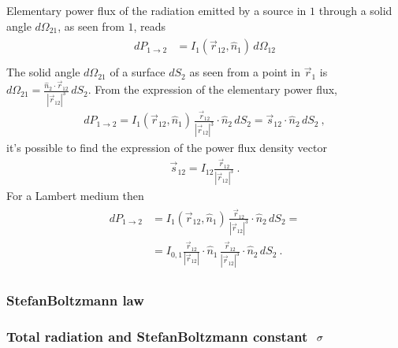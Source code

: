 \documentclass[letterpaper,10pt,english]{jupyterBook}
\begin{document}
\sphinxAtStartPar
Elementary power flux of the radiation emitted by a source in \(1\) through a solid angle \(d \Omega_{21}\), as seen from \(1\), reads
\begin{equation*}
\begin{split}\begin{aligned}
  d P_{1 \rightarrow 2}
  & = I_{1}(\vec{r}_{12}, \hat{n}_1) \, d \Omega_{12} \\
\end{aligned}\end{split}
\end{equation*}
\sphinxAtStartPar
The solid angle \(d \Omega_{21}\) of a surface \(d S_2\) as seen from a point in \(\vec{r}_1\) is \(d \Omega_{21} = \frac{\hat{n}_2 \cdot \vec{r}_{12}}{|\vec{r}_{12}|^3} \, dS_2\). From the expression of the elementary power flux,
\begin{equation*}
\begin{split}
 d P_{1 \rightarrow 2} = I_{1}(\vec{r}_{12}, \hat{n}_1) \, \frac{\vec{r}_{12} }{|\vec{r}_{12}|^3} \cdot \hat{n}_2 \, dS_2 = \vec{s}_{12} \cdot \hat{n}_2 \, dS_2 \ ,
\end{split}
\end{equation*}
\sphinxAtStartPar
it’s possible to find the expression of the power flux density vector
\begin{equation*}
\begin{split}\vec{s}_{12} = I_{12} \frac{\vec{r}_{12}}{|\vec{r}_{12}|^3} \ .\end{split}
\end{equation*}
\sphinxAtStartPar
For a Lambert medium then
\begin{equation}\label{equation:ch/heat-transfer-radiation:power-flux:radiant-intensity}
\begin{split}\begin{aligned}
 d P_{1 \rightarrow 2}
 & = I_{1}(\vec{r}_{12}, \hat{n}_1) \, \frac{\vec{r}_{12} }{|\vec{r}_{12}|^3} \cdot \hat{n}_2 \, dS_2 = \\
 & = I_{0,1} \frac{\vec{r}_{12}}{|\vec{r}_{12}|} \cdot \hat{n}_1 \, \frac{\vec{r}_{12} }{|\vec{r}_{12}|^3} \cdot \hat{n}_2 \, dS_2 \ .
\end{aligned}\end{split}
\end{equation}

\subsubsection{Stefan\sphinxhyphen{}Boltzmann law}
\label{\detokenize{ch/heat-transfer-radiation:stefan-boltzmann-law}}\subsubsection*{Total radiation and Stefan\sphinxhyphen{}Boltzmann constant \protect\(\ \sigma\protect\)}
\end{document}
